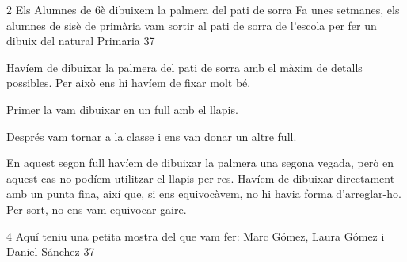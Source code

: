 %
%
\begin{news}
{2} %
{Els Alumnes de 6è dibuixem la palmera del pati de sorra}
{Fa unes setmanes, els alumnes de sisè de primària vam sortir al pati de sorra de l’escola per fer un dibuix del natural}
{Primaria}
{37}


Havíem de dibuixar la palmera del pati de sorra amb el màxim de detalls possibles. Per això ens hi havíem de fixar molt bé.

Primer la vam dibuixar en un full amb el llapis.

Després vam tornar a la classe i ens van donar un altre full.

En aquest segon full havíem de dibuixar la palmera una segona vegada, però en aquest cas no podíem utilitzar el llapis per res. Havíem de dibuixar directament  amb un punta fina, així que, si ens equivocàvem,  no hi havia forma d’arreglar-ho. Per sort,  no ens vam equivocar gaire.

\end{news}

\begin{news}
{4} %
{}
{Aquí teniu una petita mostra del que vam fer: Marc Gómez, Laura Gómez i Daniel Sánchez}
{}
{37}



\noindent{}

\noindent{}

\noindent{}

\noindent{}

\noindent{}

\noindent{}

\noindent{}

\noindent{}

\end{news}

